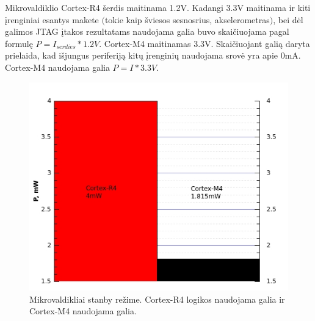 \documentclass[a4paper, 12pt]{article} %
\begin{document}
\begin{onehalfspacing}
Mikrovaldiklio Cortex-R4 \v{s}erdis maitinama 1.2V. Kadangi 3.3V maitinama ir kiti \k{i}renginiai esantys makete $($tokie kaip \v{s}viesos sesnosrius, akselerometras$)$, bei d\.{e}l galimos JTAG \k{i}takos rezultatams naudojama galia buvo skai\v{c}iuojama pagal formul\k{e} $P=I_{serdies} *1.2V$. Cortex-M4 maitinamas 3.3V. Skai\v{c}iuojant gali\k{a} daryta prielaida, kad i\v{s}jungus periferij\k{a} kit\k{u} \k{i}rengini\k{u} naudojama srov\.{e} yra apie 0mA. Cortex-M4 naudojama galia $P=I*3.3V$.
\begin{figure}[H] %
\centering %
\includegraphics[scale=0.8]{pav/modes.jpg} %
\captionsetup{labelformat=numbfirst} %
\captionsetup{labelseparator=tarpas}
\caption{Mikrovaldikliai stanby re\v{z}ime. Cortex-R4 logikos naudojama galia ir Cortex-M4 naudojama galia.}
\label{vienas}
\end{figure}
\begin{figure}[H] %
\centering %

\end{figure}
\end{onehalfspacing}
\end{document}
